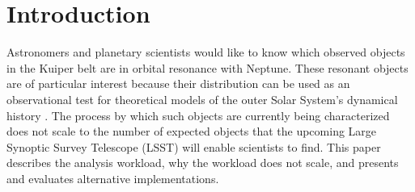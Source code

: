 \documentclass[conference]{IEEEtran}
\begin{document}
\IEEEpeerreviewmaketitle

%
%
%
%
%
%

\section{Introduction}

Astronomers and planetary scientists would like to know which observed
objects in the Kuiper belt are in orbital resonance with Neptune. These
resonant objects are of particular interest because their distribution can
be used as an observational test for theoretical models of the 
outer Solar System's dynamical history \cite{Malhotra1993,Morby2008,Volk2016}.
The process by which such objects are currently being characterized
does not scale to the number of expected objects that the
upcoming Large Synoptic Survey Telescope (LSST) will enable scientists to find.
This paper describes the analysis workload, why the workload does not
scale, and presents and evaluates alternative implementations.
\end{document}
